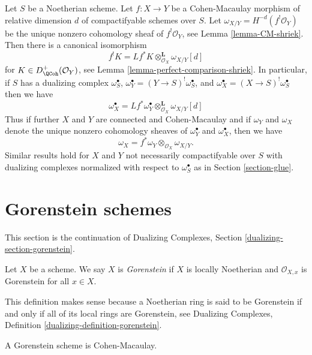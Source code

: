 \begin{remark}
\label{remark-CM-morphism-compare-dualizing}
Let $S$ be a Noetherian scheme. Let $f : X \to Y$ be a
Cohen-Macaulay morphism of relative dimension $d$
of compactifyable schemes over $S$.
Let $\omega_{X/Y} = H^{-d}(f^!\mathcal{O}_Y)$
be the unique nonzero cohomology sheaf of $f^!\mathcal{O}_Y$, see
Lemma \ref{lemma-CM-shriek}.
Then there is a canonical isomorphism
$$
f^!K = Lf^*K \otimes_{\mathcal{O}_X}^\mathbf{L} \omega_{X/Y}[d]
$$
for $K \in D^+_\QCoh(\mathcal{O}_Y)$, see
Lemma \ref{lemma-perfect-comparison-shriek}. In particular, if
$S$ has a dualizing complex $\omega_S^\bullet$,
$\omega_Y^\bullet = (Y \to S)^!\omega_S^\bullet$, and
$\omega_X^\bullet = (X \to S)^!\omega_S^\bullet$
then we have
$$
\omega_X^\bullet =
Lf^*\omega_Y^\bullet \otimes_{\mathcal{O}_X}^\mathbf{L} \omega_{X/Y}[d]
$$
Thus if further $X$ and $Y$ are connected and Cohen-Macaulay and
if $\omega_Y$ and $\omega_X$ denote the unique nonzero cohomology
sheaves of $\omega_Y^\bullet$ and $\omega_X^\bullet$, then we
have
$$
\omega_X = f^*\omega_Y \otimes_{\mathcal{O}_X} \omega_{X/Y}.
$$
Similar results hold for $X$ and $Y$ not necessarily compactifyable
over $S$ with dualizing complexes normalized with respect to
$\omega_S^\bullet$ as in Section \ref{section-glue}.
\end{remark}





\section{Gorenstein schemes}
\label{section-gorenstein}

\noindent
This section is the continuation of Dualizing Complexes, Section
\ref{dualizing-section-gorenstein}.

\begin{definition}
\label{definition-gorenstein}
Let $X$ be a scheme. We say $X$ is {\it Gorenstein} if $X$ is
locally Noetherian and $\mathcal{O}_{X, x}$ is Gorenstein for all $x \in X$.
\end{definition}

\noindent
This definition makes sense because a Noetherian ring is said to
be Gorenstein if and only if all of its local rings are Gorenstein,
see Dualizing Complexes, Definition \ref{dualizing-definition-gorenstein}.

\begin{lemma}
\label{lemma-gorenstein-CM}
A Gorenstein scheme is Cohen-Macaulay.
\end{lemma}

